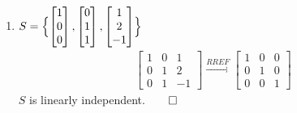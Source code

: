 \documentclass[12pt, a4paper]{article}
\begin{document}
\begin{enumerate}[Q\arabic*.]
\begin{enumerate}[(\alph*)]
      \item $S = \Bigl\{\begin{bmatrix}1\\0\\0\end{bmatrix}, \begin{bmatrix}0\\1\\1\end{bmatrix}, \begin{bmatrix}1\\2\\-1\end{bmatrix}\Bigr\}$ 
      \begin{align*}
        \begin{bmatrix}
          1 & 0 & 1\\
          0 & 1 & 2\\
          0 & 1 & -1
        \end{bmatrix}\xrightarrow{RREF}
        \begin{bmatrix}
          1 & 0 & 0\\
          0 & 1 & 0\\
          0 & 0 & 1
        \end{bmatrix}
      \end{align*}
      $S$ is linearly independent.$\qed$
    \end{enumerate}


\end{enumerate}
\end{document}
